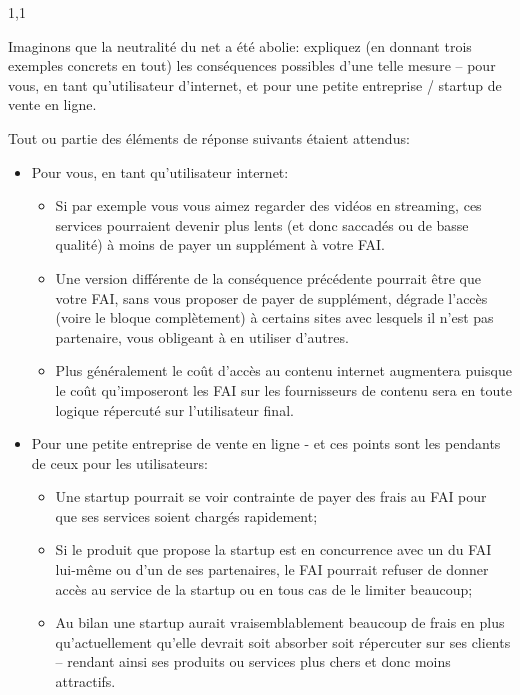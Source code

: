 \documentclass[11pt,a4paper]{exam}
\begin{document}
\begin{spacing}{1,1}
\begin{questions}
        	
        	\question[2] Imaginons que la neutralité du net a été abolie: expliquez (en donnant trois exemples concrets en tout) les conséquences possibles d'une telle mesure -- pour vous, en tant qu'utilisateur d'internet, et pour une petite entreprise / startup de vente en ligne.
			\begin{solution}
				Tout ou partie des éléments de réponse suivants étaient attendus:
				\begin{itemize}
					\item Pour vous, en tant qu'utilisateur internet:
					\begin{itemize}
						\item Si par exemple vous vous aimez regarder des vidéos en streaming, ces services pourraient devenir plus lents (et donc saccadés ou de basse qualité) à moins de payer un supplément à votre FAI.
						\item Une version différente de la conséquence précédente pourrait être que votre FAI, sans vous proposer de payer de supplément, dégrade l'accès (voire le bloque complètement) à certains sites avec lesquels il n'est pas partenaire, vous obligeant à en utiliser d'autres.
						\item Plus généralement le coût d'accès au contenu internet augmentera puisque le coût qu'imposeront les FAI sur les fournisseurs de contenu sera en toute logique répercuté sur l'utilisateur final.
					\end{itemize}
					\item Pour une petite entreprise de vente en ligne - et ces points sont les pendants de ceux pour les utilisateurs:
					\begin{itemize}
						\item Une startup pourrait se voir contrainte de payer des frais au FAI pour que  ses services soient chargés rapidement;
						\item Si le produit que propose la startup est en concurrence avec un du FAI lui-même ou d'un de ses partenaires, le FAI pourrait refuser de donner accès au service de la startup ou en tous cas de le limiter beaucoup;
						\item Au bilan une startup aurait vraisemblablement beaucoup de frais en plus qu'actuellement qu'elle devrait soit absorber soit répercuter sur ses clients -- rendant ainsi ses produits ou services plus chers et donc moins attractifs.
					\end{itemize}
				\end{itemize}
			\end{solution}
        	

\end{questions}
\end{spacing}
\end{document}
